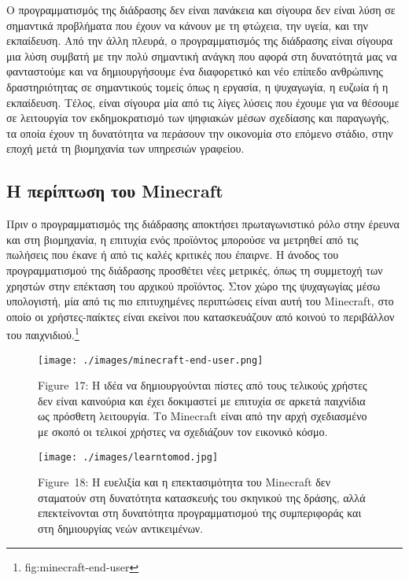 \documentclass[
]{article}
\begin{document}
Ο προγραμματισμός της διάδρασης δεν είναι πανάκεια και σίγουρα δεν είναι
λύση σε σημαντικά προβλήματα που έχουν να κάνουν με τη φτώχεια, την
υγεία, και την εκπαίδευση. Από την άλλη πλευρά, ο προγραμματισμός της
διάδρασης είναι σίγουρα μια λύση συμβατή με την πολύ σημαντική ανάγκη
που αφορά στη δυνατότητά μας να φανταστούμε και να δημιουργήσουμε ένα
διαφορετικό και νέο επίπεδο ανθρώπινης δραστηριότητας σε σημαντικούς
τομείς όπως η εργασία, η ψυχαγωγία, η ευζωία ή η εκπαίδευση. Τέλος,
είναι σίγουρα μία από τις λίγες λύσεις που έχουμε για να θέσουμε σε
λειτουργία τον εκδημοκρατισμό των ψηφιακών μέσων σχεδίασης και
παραγωγής, τα οποία έχουν τη δυνατότητα να περάσουν την οικονομία στο
επόμενο στάδιο, στην εποχή μετά τη βιομηχανία των υπηρεσιών γραφείου.

\hypertarget{ux3b7-ux3c0ux3b5ux3c1ux3afux3c0ux3c4ux3c9ux3c3ux3b7-ux3c4ux3bfux3c5-minecraft}{%
\subsection{Η περίπτωση του
Minecraft}\label{ux3b7-ux3c0ux3b5ux3c1ux3afux3c0ux3c4ux3c9ux3c3ux3b7-ux3c4ux3bfux3c5-minecraft}}

Πριν ο προγραμματισμός της διάδρασης αποκτήσει πρωταγωνιστικό ρόλο στην
έρευνα και στη βιομηχανία, η επιτυχία ενός προϊόντος μπορούσε να
μετρηθεί από τις πωλήσεις που έκανε ή από τις καλές κριτικές που
έπαιρνε. Η άνοδος του προγραμματισμού της διάδρασης προσθέτει νέες
μετρικές, όπως τη συμμετοχή των χρηστών στην επέκταση του αρχικού
προϊόντος. Στον χώρο της ψυχαγωγίας μέσω υπολογιστή, μία από τις πιο
επιτυχημένες περιπτώσεις είναι αυτή του Minecraft, στο οποίο οι
χρήστες-παίκτες είναι εκείνοι που κατασκευάζουν από κοινού το περιβάλλον
του παιχνιδιού.\footnote{fig:minecraft-end-user}

\leavevmode{}%
\begin{figure}
\hypertarget{fig:minecraft-end-user}{%
\centering
\texttt{[image: ./images/minecraft-end-user.png]}
\caption{Figure~17: Η ιδέα να δημιουργούνται πίστες από τους τελικούς
χρήστες δεν είναι καινούρια και έχει δοκιμαστεί με επιτυχία σε αρκετά
παιχνίδια ως πρόσθετη λειτουργία. Το Minecraft είναι από την αρχή
σχεδιασμένο με σκοπό οι τελικοί χρήστες να σχεδιάζουν τον εικονικό
κόσμο.}\label{fig:minecraft-end-user}
}
\end{figure}

\leavevmode{}%
\begin{figure}
\hypertarget{fig:learntomod}{%
\centering
\texttt{[image: ./images/learntomod.jpg]}
\caption{Figure~18: Η ευελιξία και η επεκτασιμότητα του Minecraft δεν
σταματούν στη δυνατότητα κατασκευής του σκηνικού της δράσης, αλλά
επεκτείνονται στη δυνατότητα προγραμματισμού της συμπεριφοράς και στη
δημιουργίας νεών αντικειμένων.}\label{fig:learntomod}
}
\end{figure}
\end{document}

